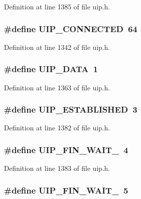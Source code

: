 Definition at line 1385 of file uip.h.

\hypertarget{group__uip_gaf84316f469ce0726985c0702db49a989}{
\subsubsection[{UIP\_\-CONNECTED}]{\setlength{\rightskip}{0pt plus 5cm}\#define UIP\_\-CONNECTED~64}}
\label{group__uip_gaf84316f469ce0726985c0702db49a989}


Definition at line 1342 of file uip.h.

\hypertarget{group__uip_gaabc40c09f49d15acb1b1a7f02bb3a807}{
\subsubsection[{UIP\_\-DATA}]{\setlength{\rightskip}{0pt plus 5cm}\#define UIP\_\-DATA~1}}
\label{group__uip_gaabc40c09f49d15acb1b1a7f02bb3a807}


Definition at line 1363 of file uip.h.

\hypertarget{group__uip_gaae59b70658f28ee6e998eaaab05e423f}{
\subsubsection[{UIP\_\-ESTABLISHED}]{\setlength{\rightskip}{0pt plus 5cm}\#define UIP\_\-ESTABLISHED~3}}
\label{group__uip_gaae59b70658f28ee6e998eaaab05e423f}


Definition at line 1382 of file uip.h.

\hypertarget{group__uip_gaa533c394b1fa0030205534befa31c525}{
\subsubsection[{UIP\_\-FIN\_\-WAIT\_\-1}]{\setlength{\rightskip}{0pt plus 5cm}\#define UIP\_\-FIN\_\-WAIT\_~4}}
\label{group__uip_gaa533c394b1fa0030205534befa31c525}


Definition at line 1383 of file uip.h.

\hypertarget{group__uip_ga160128ab5d2ea3cc497b91ee4eb4ef99}{
\subsubsection[{UIP\_\-FIN\_\-WAIT\_\-2}]{\setlength{\rightskip}{0pt plus 5cm}\#define UIP\_\-FIN\_\-WAIT\_~5}}
\label{group__uip_ga160128ab5d2ea3cc497b91ee4eb4ef99}


